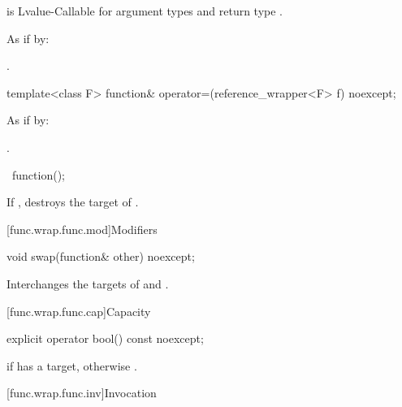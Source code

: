 \begin{itemdescr}
\pnum
\constraints
{} is Lvalue-Callable
for argument types  and return type .

\pnum
\effects
As if by: 

\pnum
\returns
{}.
\end{itemdescr}

%
\begin{itemdecl}
template<class F> function& operator=(reference_wrapper<F> f) noexcept;
\end{itemdecl}

\begin{itemdescr}
\pnum
\effects
As if by: 

\pnum
\returns
{}.
\end{itemdescr}

%
\begin{itemdecl}
~function();
\end{itemdecl}

\begin{itemdescr}
\pnum
\effects
If , destroys the target of .
\end{itemdescr}

[func.wrap.func.mod]{Modifiers}

%
\begin{itemdecl}
void swap(function& other) noexcept;
\end{itemdecl}

\begin{itemdescr}
\pnum
\effects
Interchanges the targets of  and .
\end{itemdescr}

[func.wrap.func.cap]{Capacity}

%
\begin{itemdecl}
explicit operator bool() const noexcept;
\end{itemdecl}

\begin{itemdescr}
\pnum
\returns
{} if  has a target, otherwise .
\end{itemdescr}

[func.wrap.func.inv]{Invocation}

